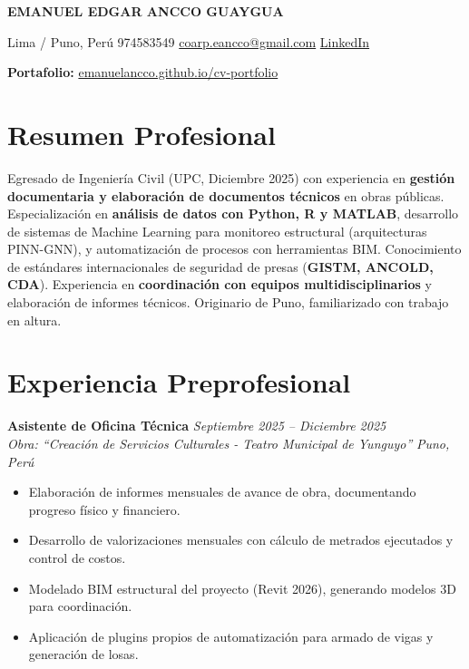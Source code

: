 \documentclass[10pt, a4paper]{article}
\newcommand{\entry}[4]{
    \textbf{#1} \hfill \textit{#2} \\
    \textit{#3} \hfill \textit{#4} \\
    \vspace{-1.5mm} 
}
\begin{document}
\begin{center}
    {\Huge\bfseries EMANUEL EDGAR ANCCO GUAYGUA}
    \vspace{2mm}

    \faMapMarker*{} Lima / Puno, Perú \quad
    \faPhone*{} 974583549 \quad
    \faEnvelope{} \href{mailto:coarp.eancco@gmail.com}{coarp.eancco@gmail.com} \quad
    \faLinkedin{} \href{https://www.linkedin.com/in/emanuel-edgar-ancco-guaygua-a61210352}{LinkedIn}
    
    \faGlobe{} \textbf{Portafolio:} \href{https://emanuelancco.github.io/cv-portfolio/}{emanuelancco.github.io/cv-portfolio}
\end{center}

\section*{Resumen Profesional}
Egresado de Ingeniería Civil (UPC, Diciembre 2025) con experiencia en \textbf{gestión documentaria y elaboración de documentos técnicos} en obras públicas. Especialización en \textbf{análisis de datos con Python, R y MATLAB}, desarrollo de sistemas de Machine Learning para monitoreo estructural (arquitecturas PINN-GNN), y automatización de procesos con herramientas BIM. Conocimiento de estándares internacionales de seguridad de presas (\textbf{GISTM, ANCOLD, CDA}). Experiencia en \textbf{coordinación con equipos multidisciplinarios} y elaboración de informes técnicos. Originario de Puno, familiarizado con trabajo en altura.

\vspace{2mm}
\begin{center}
\end{center}

\section*{Experiencia Preprofesional}

\entry{Asistente de Oficina Técnica}{Septiembre 2025 – Diciembre 2025}{Obra: ``Creación de Servicios Culturales - Teatro Municipal de Yunguyo''}{Puno, Perú}
\begin{itemize}
    \item Elaboración de informes mensuales de avance de obra, documentando progreso físico y financiero.
    \item Desarrollo de valorizaciones mensuales con cálculo de metrados ejecutados y control de costos.
    \item Modelado BIM estructural del proyecto (Revit 2026), generando modelos 3D para coordinación.
    \item Aplicación de plugins propios de automatización para armado de vigas y generación de losas.
\end{itemize}
\end{document}
